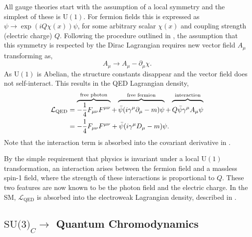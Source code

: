 All gauge theories start with the assumption of a local symmetry and the simplest of these is $\text{U}(1)$.
For fermion fields this is expressed as $\psi \rightarrow \exp{\left(i Q \chi(x)\right)} \psi$, for some arbitrary scalar $\chi(x)$ and coupling strength (electric charge) $Q$.
Following the procedure outlined in , the assumption that this symmetry is respected by the Dirac Lagrangian requires new vector field $A_\mu$ transforming as,
\begin{equation}
    \label{eq:photon_transformation}
    A_\mu \rightarrow A_\mu - \partial_\mu \chi.
\end{equation}
As $\text{U}(1)$ is Abelian, the structure constants disappear and the vector field does not self-interact.
This results in the QED Lagrangian density,
\begin{align}
    \mathcal{L}_\text{QED} & = \overbrace{-\frac{1}{4} F_{\mu\nu} F^{\mu\nu}}^{\text{free photon}}
    + \overbrace{\vphantom{\frac{1}{1}}\bar \psi (i \gamma^\mu \partial_\mu - m) \psi}^{\text{free fermion}}
    + \overbrace{\vphantom{\frac{1}{1}}Q \bar \psi \gamma^\mu A_\mu \psi}^{\text{interaction}}               \\
                           & = -\frac{1}{4} F_{\mu\nu} F^{\mu\nu} + \bar \psi (i \gamma^\mu D_\mu - m) \psi.
    \label{eq:qed_lagrangian}
\end{align}
Note that the interaction term is absorbed into the covariant derivative in .

By the simple requirement that physics is invariant under a local $\text{U}(1)$ transformation, an interaction arises between the fermion field and a massless spin-1 field, where the strength of these interactions is proportional to $Q$.
These two features are now known to be the photon field and the electric charge.
In the SM, $\mathcal{L}_\text{QED}$ is absorbed into the electroweak Lagrangian density, described in .

\subsection{\texorpdfstring{$\text{SU(3)}_C\rightarrow$}{SU(3)-} Quantum Chromodynamics}
\label{sec:qcd}

